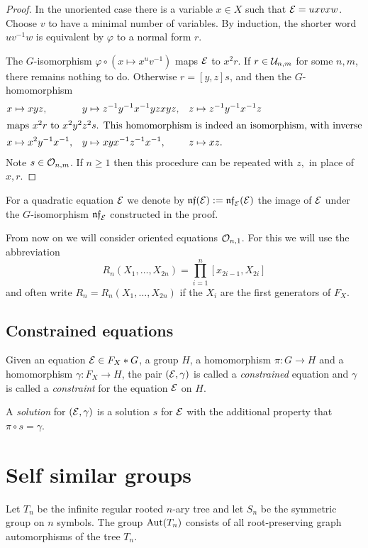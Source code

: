 \documentclass[a4paper,11pt]{amsart}
\begin{document}
\begin{proof}
  In the unoriented case there is a variable $x\in X$ such that
  $\mathcal{E} = uxvxw$. Choose $v$ to have a minimal number of variables.
  By induction, the shorter word
  $uv^{-1}w$ is equivalent by $\varphi$ to a normal form $r$.
 
  The $G$-isomorphism $\varphi \circ (x\mapsto x^uv^{-1})$ maps $\mathcal{E}$ to
  $x^2r$. If $r\in \mathcal{U}_{n,m}$ for some $n,m$,
  there remains nothing to do.  Otherwise $r=[y,z]s$, and then the
  $G$-homomorphism
  \begin{align*}
    x&\mapsto xyz, & y&\mapsto z^{-1}y^{-1}x^{-1}yzxyz, & z&\mapsto z^{-1}y^{-1}x^{-1}z \\
  \intertext{maps $x^2r$ to $x^2y^2z^2s$. This homomorphism is indeed an
  isomorphism, with inverse}
    x&\mapsto x^2y^{-1}x^{-1}, & y&\mapsto xyx^{-1}z^{-1}x^{-1}, & z&\mapsto xz.
  \end{align*}
  Note $s \in \mathcal{O}_{n,m}$. If $n\geq 1$ then this procedure can be repeated with
  $z,$ in place of $x,r$.
\end{proof}
For a quadratic equation $\mathcal{E}$ we denote by $\mathfrak{nf}(\mathcal{E}) := \mathfrak{nf}_{\mathcal{E}}(\mathcal{E})$
the image of $\mathcal{E}$ under the $G$-isomorphism $\mathfrak{nf}_{\mathcal{E}}$ constructed in
the proof.

From now on we will consider oriented equations $\mathcal{O}_{n,1}$. For this
we will use the abbreviation
\[R_n(X_1,\ldots,X_{2n})=\prod_{i=1}^n [x_{2i-1},X_{2i}]\]
and often write $R_n=R_n(X_1,\ldots,X_{2n})$ if the $X_i$ are the
first generators of $F_X$.

\subsection{Constrained equations}
\begin{defi}
  Given an equation $\mathcal{E} \in F_X*G$, a group $H$, a homomorphism
  $\pi\colon G \to H$ and a homomorphism $\gamma\colon F_X \to H$, the
  pair $(\mathcal{E},\gamma)$ is called a \emph{constrained} equation and
  $\gamma$ is called a \emph{constraint} for the equation $\mathcal{E}$ on $H$.
 
  A \emph{solution} for $(\mathcal{E},\gamma)$ is a solution $s$ for $\mathcal{E}$ with the
  additional property that $\pi\circ s=\gamma$.
\end{defi}

\section{Self similar groups}\label{sec:SelfSimilarGroups}
Let $T_n$ be the infinite regular rooted $n$-ary tree and let $S_n$ be the symmetric group on $n$ symbols.
The group $\operatorname{{Aut}}(T_n)$ consists of all root-preserving graph automorphisms of the tree $T_n$. 
\end{document}
